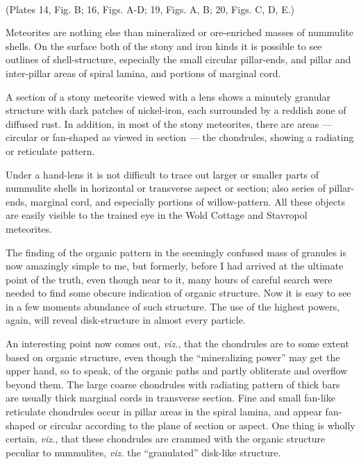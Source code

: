 \documentclass[a4paper, 12pt, oneside]{article}
\begin{document}
\paragraph{}
(Plates 14, Fig. B; 16, Figs. A-D; 19, Figs. A, B; 20, Figs. C, D, E.)

Meteorites are nothing else than mineralized or ore-enriched masses of nummulite shells. On the surface both of the stony and iron kinds it is possible to see outlines of shell-structure, especially the small circular pillar-ends, and pillar and inter-pillar areas of spiral lamina, and portions of marginal cord.

A section of a stony meteorite viewed with a lens shows a minutely granular structure with dark patches of nickel-iron, each surrounded by a reddish zone of diffused rust. In addition, in most of the stony meteorites, there are areas --- circular or fan-shaped as viewed in section --- the chondrules, showing a radiating or reticulate pattern.

Under a hand-lens it is not difficult to trace out larger or smaller parts of nummulite shells in horizontal or transverse aspect or section; also series of pillar-ends, marginal cord, and especially portions of willow-pattern. All these objects are easily visible to the trained eye in the Wold Cottage and Stavropol meteorites.

The finding of the organic pattern in the seemingly confused mass of granules is now amazingly simple to me, but formerly, before I had arrived at the ultimate point of the truth, even though near to it, many hours of careful search were needed to find some obscure indication of organic structure. Now it is easy to see in a few moments abundance of such structure. The use of the highest powers, again, will reveal disk-structure in almost every particle.

An interesting point now comes out, \emph{viz.}, that the chondrules are to some extent based on organic structure, even though the ``mineralizing power'' may get the upper hand, so to speak, of the organic paths and partly obliterate and overflow beyond them. The large coarse chondrules with radiating pattern of thick bars are usually thick marginal cords in transverse section. Fine and small fan-like reticulate chondrules occur in pillar areas in the spiral lamina, and appear fan-shaped or circular according to the plane of section or aspect. One thing is wholly certain, \emph{viz.}, that these chondrules are crammed with the organic structure peculiar to nummulites, \emph{viz.} the ``granulated'' disk-like structure.
\end{document}
